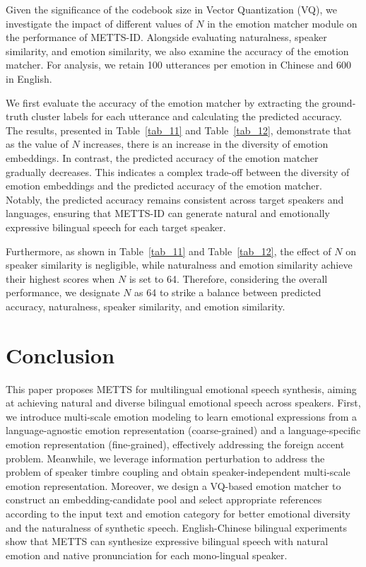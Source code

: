 \documentclass[journal,comsoc]{IEEEtran}
\begin{document}
Given the significance of the codebook size in Vector Quantization (VQ), we investigate the impact of different values of $N$ in the emotion matcher module on the performance of METTS-ID. Alongside evaluating naturalness, speaker similarity, and emotion similarity, we also examine the accuracy of the emotion matcher. For analysis, we retain 100 utterances per emotion in Chinese and 600 in English.

We first evaluate the accuracy of the emotion matcher by extracting the ground-truth cluster labels for each utterance and calculating the predicted accuracy. The results, presented in Table~\ref{tab_11} and Table~\ref{tab_12}, demonstrate that as the value of $N$ increases, there is an increase in the diversity of emotion embeddings. In contrast, the predicted accuracy of the emotion matcher gradually decreases. This indicates a complex trade-off between the diversity of emotion embeddings and the predicted accuracy of the emotion matcher. Notably, the predicted accuracy remains consistent across target speakers and languages, ensuring that METTS-ID can generate natural and emotionally expressive bilingual speech for each target speaker.

Furthermore, as shown in Table~\ref{tab_11} and Table~\ref{tab_12}, the effect of $N$ on speaker similarity is negligible, while naturalness and emotion similarity achieve their highest scores when $N$ is set to 64. Therefore, considering the overall performance, we designate $N$ as 64 to strike a balance between predicted accuracy, naturalness, speaker similarity, and emotion similarity.


\section{Conclusion}
\label{sc:conclusion}

This paper proposes METTS for multilingual emotional speech synthesis, aiming at achieving natural and diverse bilingual emotional speech across speakers. First, we introduce multi-scale emotion modeling to learn emotional expressions from a language-agnostic emotion representation (coarse-grained) and a language-specific emotion representation (fine-grained), effectively addressing the foreign accent problem. Meanwhile, we leverage information perturbation to address the problem of speaker timbre coupling and obtain speaker-independent multi-scale emotion representation. Moreover, we design a VQ-based emotion matcher to construct an embedding-candidate pool and select appropriate references according to the input text and emotion category for better emotional diversity and the naturalness of synthetic speech. English-Chinese bilingual experiments show that METTS can synthesize expressive bilingual speech with natural emotion and native pronunciation for each mono-lingual speaker.
\end{document}
